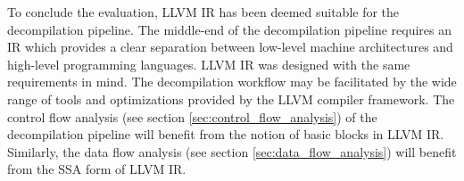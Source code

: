 To conclude the evaluation, LLVM IR has been deemed suitable for the decompilation pipeline. The middle-end of the decompilation pipeline requires an IR which provides a clear separation between low-level machine architectures and high-level programming languages. LLVM IR was designed with the same requirements in mind. The decompilation workflow may be facilitated by the wide range of tools and optimizations provided by the LLVM compiler framework. The control flow analysis (see section \ref{sec:control_flow_analysis}) of the decompilation pipeline will benefit from the notion of basic blocks in LLVM IR. Similarly, the data flow analysis (see section \ref{sec:data_flow_analysis}) will benefit from the SSA form of LLVM IR.
